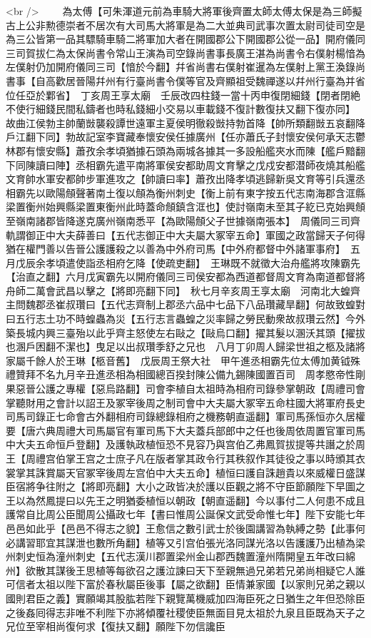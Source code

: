 <br />
　　為太傅【可朱渾道元前為車騎大將軍後齊置太師太傅太保是為三師擬古上公非勲德崇者不居次有大司馬大將軍是為二大並典司武事次置太尉司徒司空是為三公皆第一品其驃騎車騎二將軍加大者在開國郡公下開國郡公從一品】開府儀同三司賀拔仁為太保尚書令常山王演為司空錄尚書事長廣王湛為尚書令右僕射楊愔為左僕射仍加開府儀同三司【愔於今翻】幷省尚書右僕射崔暹為左僕射上黨王渙錄尚書事【自高歡居晉陽幷州有行臺尚書令僕等官及齊顯祖受魏禪遂以幷州行臺為并省位任亞於鄴省】　丁亥周王享太廟　壬辰改四柱錢一當十丙申復閉細錢【閉者閉絶不使行細錢民間私鑄者也時私錢細小交易以車載錢不復計數復扶又翻下復亦同】　故曲江侯勃主帥蘭敱襲殺譚世遠軍主夏侯明徹殺敱持勃首降【帥所類翻敱五哀翻降戶江翻下同】勃故記室李寶藏奉懷安侯任據廣州【任亦蕭氏子封懷安侯何承天志鬱林郡有懷安縣】蕭孜余孝頃猶據石頭為兩城各據其一多設船艦夾水而陳【艦戶黯翻下同陳讀曰陣】丞相霸先遣平南將軍侯安都助周文育擊之戊戍安都潜師夜燒其船艦文育帥水軍安都帥步軍進攻之【帥讀曰率】蕭孜出降孝頃逃歸新吳文育等引兵還丞相霸先以歐陽頠聲著南土復以頠為衡州刺史【衡上前有東字按五代志南海郡含洭縣梁置衡州始興縣梁置東衡州此時蓋命頠鎮含洭也】使討嶺南未至其子紇已克始興頠至嶺南諸郡皆降遂克廣州嶺南悉平【為歐陽頠父子世據嶺南張本】　周儀同三司齊軌謂御正中大夫薛善曰【五代志御正中大夫屬大冢宰五命】軍國之政當歸天子何得猶在權門善以告晉公護護殺之以善為中外府司馬【中外府都督中外諸軍事府】　五月戊辰余孝頃遣使詣丞相府乞降【使疏吏翻】　王琳既不就徵大治舟艦將攻陳霸先【治直之翻】六月戊寅霸先以開府儀同三司侯安都為西道都督周文育為南道都督將舟師二萬會武昌以擊之【將即亮翻下同】　秋七月辛亥周王享太廟　河南北大蝗齊主問魏郡丞崔叔瓚曰【五代志齊制上郡丞六品中七品下八品瓚藏旱翻】何故致蝗對曰五行志土功不時蝗蟲為災【五行志言蟲蝗之災率歸之勞民動衆故叔瓚云然】今外築長城内興三臺殆以此乎齊主怒使左右敺之【敺烏口翻】擢其髮以溷沃其頭【擢拔也溷戶困翻不潔也】曳足以出叔瓚季舒之兄也　八月丁卯周人歸梁世祖之柩及諸將家屬千餘人於王琳【柩音舊】　戊辰周王祭大社　甲午進丞相霸先位太傅加黄钺殊禮贊拜不名九月辛丑進丞相為相國總百揆封陳公備九錫陳國置百司　周孝愍帝性剛果惡晉公護之專權【惡烏路翻】司會李植自太祖時為相府司錄參掌朝政【周禮司會掌聽財用之會計以詔王及冢宰後周之制司會中大夫屬大冢宰五命柱國大將軍府長史司馬司錄正七命會古外翻相府司錄總錄相府之機務朝直遥翻】軍司馬孫恒亦久居權要【唐六典周禮大司馬屬官有軍司馬下大夫蓋兵部郎中之任也後周依周置官軍司馬中大夫五命恒戶登翻】及護執政植恒恐不見容乃與宫伯乙弗鳳賀拔提等共譖之於周王【周禮宫伯掌王宫之士庶子凡在版者掌其政令行其秩叙作其徒役之事以時頒其衣裳掌其誅賞屬天官冢宰後周左宫伯中大夫五命】植恒曰護自誅趙貴以來威權日盛謀臣宿將争往附之【將即亮翻】大小之政皆决於護以臣觀之將不守臣節願陛下早圖之王以為然鳳提曰以先王之明猶委植恒以朝政【朝直遥翻】今以事付二人何患不成且護常自比周公臣聞周公攝政七年【書曰惟周公誕保文武受命惟七年】陛下安能七年邑邑如此乎【邑邑不得志之貌】王愈信之數引武士於後園講習為執縛之勢【此事何必講習耶宜其謀泄也數所角翻】植等又引宫伯張光洛同謀光洛以告護護乃出植為梁州刺史恒為潼州刺史【五代志漢川郡置梁州金山郡西魏置潼州隋開皇五年改曰綿州】欲散其謀後王思植等每欲召之護泣諫曰天下至親無過兄弟若兄弟尚相疑它人誰可信者太祖以陛下富於春秋屬臣後事【屬之欲翻】臣情兼家國【以家則兄弟之親以國則君臣之義】實願竭其股肱若陛下親覽萬機威加四海臣死之日猶生之年但恐除臣之後姦囘得志非唯不利陛下亦將傾覆社稷使臣無面目見太祖於九泉且臣既為天子之兄位至宰相尚復何求【復扶又翻】願陛下勿信讒臣